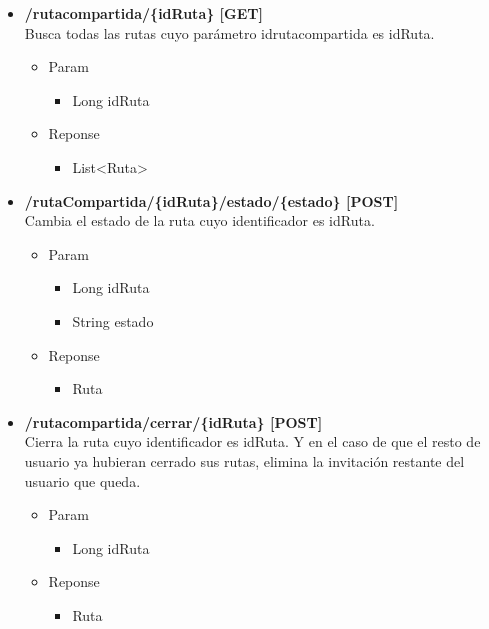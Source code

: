 \begin{itemize}
\begin{itemize}
\item \textbf{/rutacompartida/\{idRuta\} [GET]}\\
Busca todas las rutas cuyo parámetro idrutacompartida es idRuta.
\begin{itemize}
\item Param
\begin{itemize}
\item Long idRuta
\end{itemize}
\item Reponse
\begin{itemize}
\item List<Ruta>
\end{itemize}
\end{itemize}
\end{itemize}


\begin{itemize}
\item  \textbf{/rutaCompartida/\{idRuta\}/estado/\{estado\} [POST]}\\
Cambia el estado de la ruta cuyo identificador es idRuta.
\begin{itemize}
\item Param
\begin{itemize}
\item  Long idRuta
\item String estado
\end{itemize}
\item Reponse
\begin{itemize}
\item Ruta
\end{itemize}
\end{itemize}
\end{itemize}


\begin{itemize}
\item  \textbf{/rutacompartida/cerrar/\{idRuta\} [POST]}\\
Cierra la ruta cuyo identificador es idRuta. Y en el caso de que el resto de usuario ya hubieran cerrado sus rutas, elimina la invitación restante del usuario que queda.
\begin{itemize}
\item Param
\begin{itemize}
\item Long idRuta
\end{itemize}
\item Reponse
\begin{itemize}
\item Ruta
\end{itemize}
\end{itemize}
\end{itemize}



\end{itemize}
